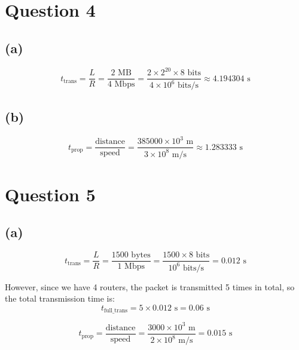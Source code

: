 \documentclass[a4paper,12pt]{article}
\begin{document}
\section*{Question 4}

\subsection*{(a)}

\begin{equation*}
  t_{\text{trans}} = \frac{L}{R} = \frac{2 \text{ MB}}{4 \text{ Mbps}} = \frac{2 \times 2^{20} \times 8 \text{ bits}}{4 \times 10^6 \text{ bits/s}} \approx 4.194304 \text{ s}
\end{equation*}

\subsection*{(b)}

\begin{equation*}
  t_{\text{prop}} = \frac{\text{distance}}{\text{speed}} = \frac{385000 \times 10^3 \text{ m}}{3 \times 10^8 \text{ m/s}} \approx 1.283333 \text{ s}
\end{equation*}

\section*{Question 5}

\subsection*{(a)}

\begin{equation*}
  t_{\text{trans}} = \frac{L}{R} = \frac{1500 \text{ bytes}}{1 \text{ Mbps}} = \frac{1500 \times 8 \text{ bits}}{10^6 \text{ bits/s}} = 0.012 \text{ s}
\end{equation*}

However, since we have 4 routers, the packet is transmitted 5 times in total, so the total transmission time is:
\begin{equation*}
  t_{\text{full\_trans}} = 5 \times 0.012 \text{ s} = 0.06 \text{ s}
\end{equation*}

\begin{equation*}
  t_{\text{prop}} = \frac{\text{distance}}{\text{speed}} = \frac{3000 \times 10^3 \text{ m}}{2 \times 10^8 \text{ m/s}} = 0.015 \text{ s}
\end{equation*}
\end{document}
